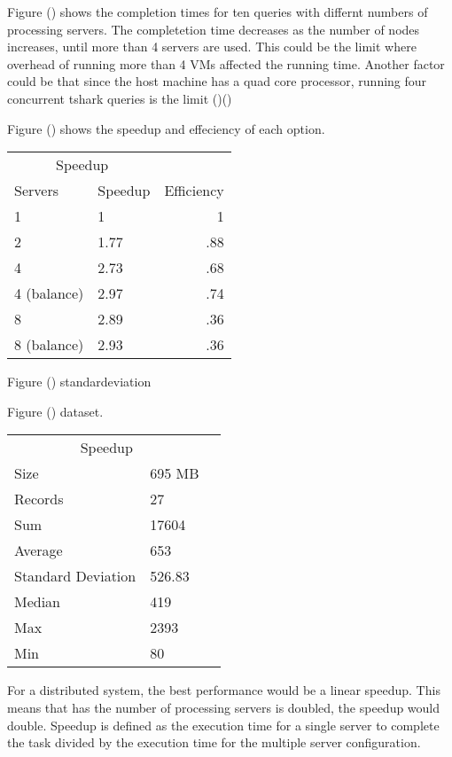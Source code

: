 \documentclass{article}
\begin{document}
\begin{multicols}{2}
Figure () shows the completion times for ten queries with differnt numbers of processing servers.  The completetion time decreases as the number of nodes increases, until more than 4 servers are used.  This could be the limit where overhead of running more than 4 VMs affected the running time.  Another factor could be that since the host machine has a quad core processor, running four concurrent tshark queries is the limit ()()



Figure () shows the speedup and effeciency of each option.




\begin{tabular}{llr}
\hline
\multicolumn{2}{c}{Speedup} \\
\cline{1-2}
Servers    & Speedup & Efficiency  \\
\hline
1     &  1  & 1   \\
2     &   1.77  & .88  \\
4     &   2.73  & .68 \\
4 (balance) & 2.97 & .74     \\
8 &  2.89   & .36  \\
8 (balance) & 2.93 & .36      \\
\hline
\end{tabular}





Figure () standardeviation


Figure () dataset.


\begin{tabular}{llr}
\hline
\multicolumn{2}{c}{Speedup} \\
\cline{1-2}
Size & 695 MB \\
Records & 27 \\
Sum & 17604 \\
Average & 653 \\ 
Standard Deviation & 526.83 \\
Median & 419 \\
Max & 2393 \\
Min & 80 \\
\hline
\end{tabular}



For a distributed system, the best performance would be a linear speedup.  This means that has the number of processing servers is doubled, the speedup would double. Speedup is defined as the execution time for a single server to complete the task divided by the execution time for the multiple server configuration.


\end{multicols}
\end{document}
